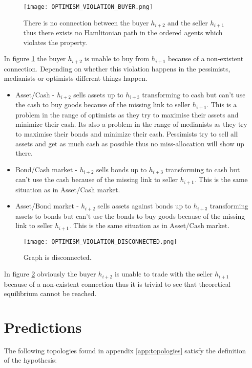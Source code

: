 \documentclass[Bachelorarbeit.tex]{subfiles}
\begin{document}
\begin{figure}[H]
	\centering
  \texttt{[image: OPTIMISM\_VIOLATION\_BUYER.png]}
  	\caption{There is no connection between the buyer $h_{i+2}$ and the seller $h_{i+1}$ thus there exists no Hamlitonian path in the ordered agents which violates the property.}
	\label{fig:OPTIMISM_VIOLATION_BUYER}
\end{figure}

In figure \ref{fig:OPTIMISM_VIOLATION_BUYER} the buyer $h_{i+2}$ is unable to buy from $h_{i+1}$ because of a non-existent connection. Depending on whether this violation happens in the pessimists, medianists or optimists different things happen.

\begin{itemize}
\item Asset/Cash - $h_{i+2}$ sells assets up to $h_{i+3}$ transforming to cash but can't use the cash to buy goods because of the missing link to seller $h_{i+1}$. This is a problem in the range of optimists as they try to maximise their assets and minimize their cash. Its also a problem in the range of medianists as they try to maximise their bonds and minimize their cash. Pessimists try to sell all assets and get as much cash as possible thus no miss-allocation will show up there.
\item Bond/Cash market - $h_{i+2}$ sells bonds up to $h_{i+3}$ transforming to cash but can't use the cash because of the missing link to seller $h_{i+1}$. This is the same situation as in Asset/Cash market.
\item Asset/Bond market - $h_{i+2}$ sells assets against bonds up to $h_{i+3}$ transforming assets to bonds but can't use the bonds to buy goods because of the missing link to seller $h_{i+1}$. This is the same situation as in Asset/Cash market.
\end{itemize}

\begin{figure}[H]
	\centering
  \texttt{[image: OPTIMISM\_VIOLATION\_DISCONNECTED.png]}
  	\caption{Graph is disconnected.}
	\label{fig:OPTIMISM_VIOLATION_DISCONNECTED}
\end{figure}

In figure \ref{fig:OPTIMISM_VIOLATION_DISCONNECTED} obviously the buyer $h_{i+2}$ is unable to trade with the seller $h_{i+1}$ because of a non-existent connection thus it is trivial to see that theoretical equilibrium cannot be reached.

\section{Predictions}
The following topologies found in appendix \ref{app:topologies} satisfy the definition of the hypothesis:
\end{document}
